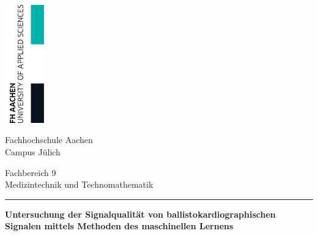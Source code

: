 \begin{titlepage}

	\thispagestyle{empty}
	

	\begin{flushright}
		\includegraphics[width=1.7cm]{./pic/FHAC.jpg}
	\end{flushright}
	
	\vspace{-3.5cm}


	\centering \begin{bfseries} \Large Fachhochschule Aachen\\
	\normalsize Campus Jülich\end{bfseries}

	\vspace{1cm}
	\normalsize
	Fachbereich 9\\
	Medizintechnik und Technomathematik
	
	\vspace{0.5cm}
	
	\centering \rule{0.75\textwidth}{1pt}
	
	\vspace{0.5cm}

	\centering \begin{minipage}[t]{17cm}
		\centering \bfseries \huge Untersuchung der Signalqualität von ballistokardiographischen Signalen mittels Methoden des maschinellen Lernens\medskip
	\end{minipage}

	\vspace{0.5cm}
	

\end{titlepage}
